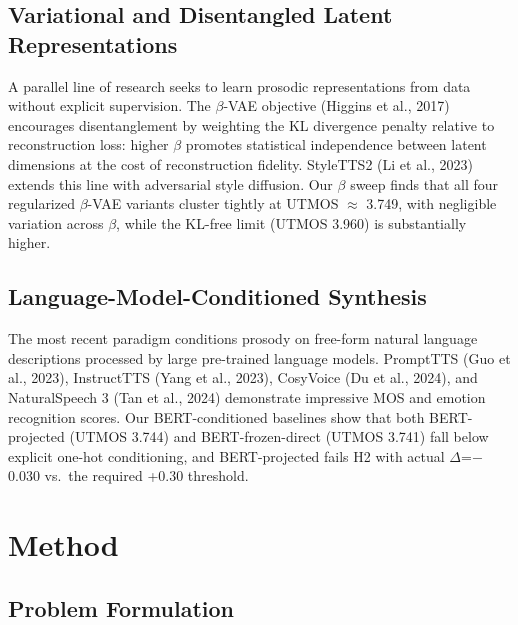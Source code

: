 \documentclass{article}
\begin{document}
\subsection{Variational and Disentangled Latent Representations}

\label{sec:variational_and_disentangled_latent_repr}

A parallel line of research seeks to learn prosodic representations from data without explicit supervision. The $\beta$-VAE objective (Higgins et al., 2017) encourages disentanglement by weighting the KL divergence penalty relative to reconstruction loss: higher $\beta$ promotes statistical independence between latent dimensions at the cost of reconstruction fidelity. StyleTTS2 (Li et al., 2023) extends this line with adversarial style diffusion. Our $\beta$ sweep finds that all four regularized $\beta$-VAE variants cluster tightly at UTMOS $\approx$ 3.749, with negligible variation across $\beta$, while the KL-free limit (UTMOS 3.960) is substantially higher.

\subsection{Language-Model-Conditioned Synthesis}

\label{sec:language_model_conditioned_synthesis}

The most recent paradigm conditions prosody on free-form natural language descriptions processed by large pre-trained language models. PromptTTS (Guo et al., 2023), InstructTTS (Yang et al., 2023), CosyVoice (Du et al., 2024), and NaturalSpeech 3 (Tan et al., 2024) demonstrate impressive MOS and emotion recognition scores. Our BERT-conditioned baselines show that both BERT-projected (UTMOS 3.744) and BERT-frozen-direct (UTMOS 3.741) fall below explicit one-hot conditioning, and BERT-projected fails H2 with actual $\Delta$=$-$0.030 vs.\ the required +0.30 threshold.

\section{Method}

\label{sec:method}

\subsection{Problem Formulation}

\label{sec:problem_formulation}
\end{document}

